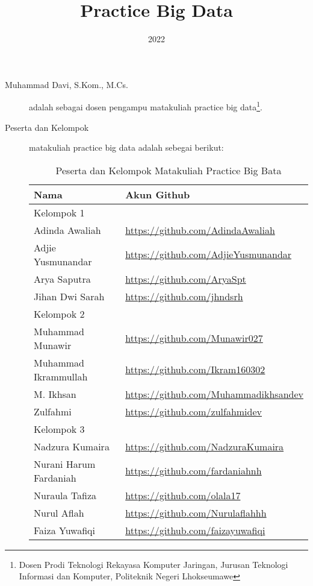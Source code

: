 \documentclass[a4paper]{tufte-handout}
\title{Practice Big Data}
\date{2022}
\begin{document}
\maketitle


\begin{projects}
\begin{description}
\item [Muhammad Davi, S.Kom., M.Cs.] adalah sebagai dosen pengampu matakuliah practice big data\footnote{Dosen Prodi Teknologi Rekayasa Komputer Jaringan, Jurusan Teknologi Informasi dan Komputer, Politeknik Negeri Lhokseumawe}.
\item [Peserta dan Kelompok] matakuliah practice big data adalah sebegai berikut:

\begin{table}[!ht]
\caption{Peserta dan Kelompok Matakuliah Practice Big Bata}
\label{tab:peserta}
\centering
\begin{tabular}{ll} 
\toprule
Nama &	Akun Github\\
\midrule
Kelompok 1\\
\midrule
Adinda Awaliah			& \url{https://github.com/AdindaAwaliah} \\
Adjie Yusmunandar		& \url{https://github.com/AdjieYusmunandar} \\
Arya Saputra			& \url{https://github.com/AryaSpt} \\
Jihan Dwi Sarah			& \url{https://github.com/jhndsrh} \\
\midrule
Kelompok 2\\
\midrule
Muhammad Munawir		& \url{https://github.com/Munawir027} \\
Muhammad Ikrammullah	& \url{https://github.com/Ikram160302} \\
M. Ikhsan				& \url{https://github.com/Muhammadikhsandev} \\
Zulfahmi				& \url{https://github.com/zulfahmidev} \\
\midrule
Kelompok 3\\
\midrule
Nadzura Kumaira			& \url{https://github.com/NadzuraKumaira} \\
Nurani Harum Fardaniah	& \url{https://github.com/fardaniahnh} \\
Nuraula Tafiza			& \url{https://github.com/olala17} \\
Nurul Aflah				& \url{https://github.com/Nurulaflahhh} \\
Faiza Yuwafiqi			& \url{https://github.com/faizayuwafiqi} \\

\end{tabular}
\end{table}
\end{description}
\end{projects}
\end{document}
